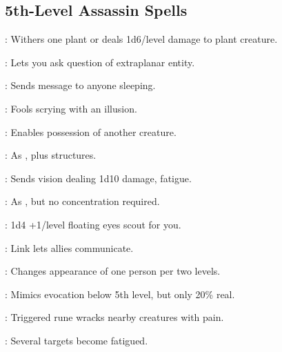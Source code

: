 \begin{multicols}{2}
\subsection{5th-Level Assassin Spells}
\begin{description*}
\item[\linkspell{Blight}:] Withers one plant or deals 1d6/level damage to plant creature.
\item[\linkspell{Contact Other Plane}:] Lets you ask question of extraplanar entity.
\item[\linkspell{Dream}:] Sends message to anyone sleeping.
\item[\linkspell{False Vision}:] Fools scrying with an illusion.
\item[\linkspell{Magic Jar}:] Enables possession of another creature.
\item[\linkspell{Mirage Arcana}:] As , plus structures.
\item[\linkspell{Nightmare}:] Sends vision dealing 1d10 damage, fatigue.
\item[\linkspell{Persistent Image}:] As , but no concentration required.
\item[\linkspell{Prying Eyes}:] 1d4 +1/level floating eyes scout for you.
\item[\linkspell{Rary’s Telepathic Bond}:] Link lets allies communicate.
\item[\linkspell{Seeming}:] Changes appearance of one person per two levels.
\item[\linkspell{Shadow Evocation}:] Mimics evocation below 5th level, but only 20\% real.
\item[\linkspell{Symbol of Pain}:] Triggered rune wracks nearby creatures with pain.
\item[\linkspell{Waves of Fatigue}:] Several targets become fatigued.
\end{description*}


\end{multicols}
